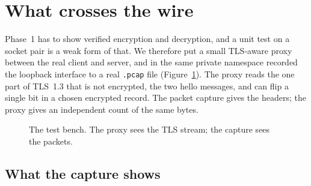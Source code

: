 \documentclass[11pt,a4paper]{article}
\newcommand{\prog}[1]{\texttt{#1}}
\begin{document}
\FloatBarrier
\section{What crosses the wire}

Phase~1 has to show verified encryption and decryption, and a unit test on a socket pair is a weak
form of that. We therefore put a small TLS-aware proxy between the real client and server, and in
the same private namespace recorded the loopback interface to a real \prog{.pcap} file
(Figure~\ref{fig:wirerig}). The proxy reads the one part of TLS~1.3 that is not encrypted, the two
hello messages, and can flip a single bit in a chosen encrypted record. The packet capture gives
the headers; the proxy gives an independent count of the same bytes.

\begin{figure}[!tbp]
\centering
{}
\caption{The test bench. The proxy sees the TLS stream; the capture sees the packets.}
\label{fig:wirerig}
\end{figure}

\subsection{What the capture shows}
\end{document}
